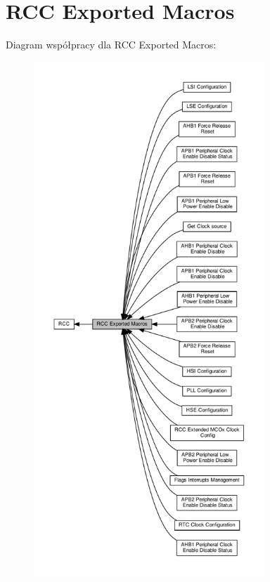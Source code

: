 \hypertarget{group___r_c_c___exported___macros}{}\section{R\+CC Exported Macros}
\label{group___r_c_c___exported___macros}
Diagram współpracy dla R\+CC Exported Macros\+:\nopagebreak
\begin{figure}[H]
\begin{center}
\leavevmode
\includegraphics[height=550pt]{group___r_c_c___exported___macros}
\end{center}
\end{figure}
